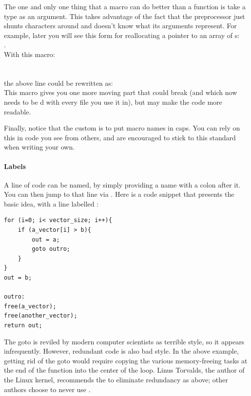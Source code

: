 \documentclass[12pt]{article}
\makeatletter
\def\ttind#1{\index{#1@\cinline{#1}}\cinline{#1}}
\makeatother
\begin{document}
The one and only one thing that a macro can do better than a function is
take a type as an argument. This takes advantage of the fact that the preprocessor 
just shunts characters around and doesn't know what its arguments represent.
For example, later you will see this form for reallocating a pointer to an array of s:\\
.\\
With this macro:\\
\\
\\the above line could be rewritten as:\\
This macro gives you one more moving part that could break (and which
now needs to be d with every file you use it in), but
may make the code more readable.


Finally, notice that the custom is to put macro names in caps.  You can
rely on this in code you see from others, and are encouraged to stick
to this standard when writing your own.

\paragraph{Labels} A line of code can be named, by simply providing a
name with a colon after it. You can then jump to that line via \ttind{goto}. Here is a code snippet that presents the basic idea, with a line labelled :
\begin{lstlisting}
for (i=0; i< vector_size; i++){
    if (a_vector[i] > b){
        out = a;
        goto outro;
    }
}
out = b;

outro:
free(a_vector);
free(another_vector);
return out;
\end{lstlisting}
The goto is reviled by modern computer scientists as terrible style, so
it appears infrequently. However, redundant code is also bad style. 
In the above example, getting rid of the goto would require
copying the various memory-freeing
tasks at the end of the function into the center of the  loop.
Linus Torvalds, the author of the Linux kernel, recommends the  to eliminate redundancy as above; other authors choose to never use
.
\end{document}
